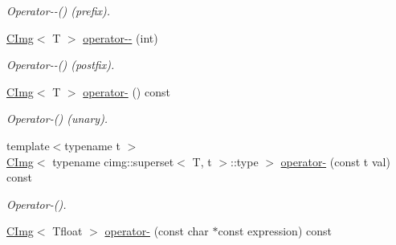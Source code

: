 \begin{DoxyCompactItemize}
\begin{DoxyCompactList}\small\item\em Operator-\/-\/() (prefix). \item\end{DoxyCompactList}\item 
\hypertarget{structcimg__library_1_1CImg_ad0aa6fe646ae580b616d26b154205f84}{
\hyperlink{structcimg__library_1_1CImg}{CImg}$<$ T $>$ \hyperlink{structcimg__library_1_1CImg_ad0aa6fe646ae580b616d26b154205f84}{operator-\/-\/} (int)}
\label{structcimg__library_1_1CImg_ad0aa6fe646ae580b616d26b154205f84}

\begin{DoxyCompactList}\small\item\em Operator-\/-\/() (postfix). \item\end{DoxyCompactList}\item 
\hypertarget{structcimg__library_1_1CImg_ae8c181b212c22dbee4ee228cac4c00d4}{
\hyperlink{structcimg__library_1_1CImg}{CImg}$<$ T $>$ \hyperlink{structcimg__library_1_1CImg_ae8c181b212c22dbee4ee228cac4c00d4}{operator-\/} () const }
\label{structcimg__library_1_1CImg_ae8c181b212c22dbee4ee228cac4c00d4}

\begin{DoxyCompactList}\small\item\em Operator-\/() (unary). \item\end{DoxyCompactList}\item 
\hypertarget{structcimg__library_1_1CImg_ae6a126bc44312a66e3b125d9cb14f874}{
{\footnotesize template$<$typename t $>$ }\\\hyperlink{structcimg__library_1_1CImg}{CImg}$<$ typename cimg::superset$<$ T, t $>$::type $>$ \hyperlink{structcimg__library_1_1CImg_ae6a126bc44312a66e3b125d9cb14f874}{operator-\/} (const t val) const }
\label{structcimg__library_1_1CImg_ae6a126bc44312a66e3b125d9cb14f874}

\begin{DoxyCompactList}\small\item\em Operator-\/(). \item\end{DoxyCompactList}\item 
\hypertarget{structcimg__library_1_1CImg_a93b47d7c3af48020651be612e51bd3b8}{
\hyperlink{structcimg__library_1_1CImg}{CImg}$<$ Tfloat $>$ \hyperlink{structcimg__library_1_1CImg_a93b47d7c3af48020651be612e51bd3b8}{operator-\/} (const char $\ast$const expression) const }
\label{structcimg__library_1_1CImg_a93b47d7c3af48020651be612e51bd3b8}


\end{DoxyCompactItemize}
